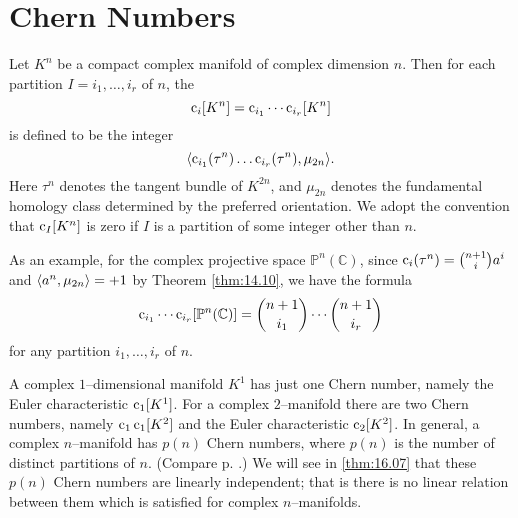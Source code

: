 \documentclass[../main]{subfiles}
\begin{document}
\section{Chern Numbers}
Let $K^n$ be a compact complex manifold of complex dimension $n$. Then for each partition $I = i_1, \ldots, i_r$ of $n$, the  \[\operatorname{c}_i[K^n] = \operatorname{c}_{i_1} \cdots \operatorname{c}_{i_r}[K^n]\] is defined to be the integer \[\langle\operatorname{c}_{i_1} (\tau^n) \ldots \operatorname{c}_{i_r}(\tau^n),\mu_{2n}\rangle.\] Here $\tau^n$ denotes the tangent bundle of $K^{2n}$, and $\mu_{2n}$ denotes the fundamental homology class determined by the preferred orientation. We adopt the convention that $\operatorname{c}_I[K^n]$ is zero if $I$ is a partition of some integer other than $n$. 

As an example, for the complex projective space ${\mathbb P}^n(\mathbb C)$, since $\operatorname{c}_i(\tau^n) = \binom {n + 1} i a^i$ and $\langle a^n,\mu_{2n}\rangle = +1$ by Theorem \ref{thm:14.10}, we have the formula \[\operatorname{c}_{i_1} \cdots \operatorname{c}_{i_r} [{\mathbb P}^n(\mathbb C)] = \binom {n + 1} {i_1} \cdots \binom {n + 1} {i_r}\] for any partition $i_1, \ldots, i_r$ of $n$. 

A complex $1$--dimensional manifold $K^1$ has just one Chern number, namely the Euler characteristic $\operatorname{c}_1[K^1]$. For a complex $2$--manifold there are two Chern numbers, namely $\operatorname{c}_1 \operatorname{c}_1[K^2]$ and the Euler characteristic $\operatorname{c}_2[K^2]$. In general, a complex $n$--manifold has $p(n)$ Chern numbers, where $p(n)$ is the number of distinct partitions of $n$. (Compare p. \pageref{def:06.06}.) We will see in \ref{thm:16.07} that these $p(n)$ Chern numbers are linearly independent; that is there is no linear relation between them which is satisfied for  complex $n$--manifolds. 
\end{document}
